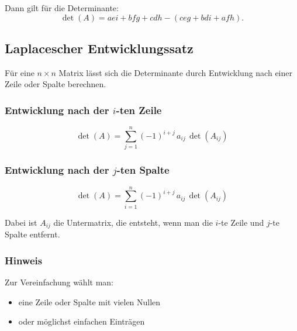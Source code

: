 \documentclass[9pt,a4paper]{article}
\begin{document}
    Dann gilt für die Determinante:
    \[
    \det(A)
    =
    aei + bfg + cdh
    -
    (ceg + bdi + afh).
    \]
    
    \subsection{Laplacescher Entwicklungssatz}
    Für eine $n\times n$ Matrix lässt sich die Determinante durch Entwicklung nach
    einer Zeile oder Spalte berechnen.
    
    \subsubsection*{Entwicklung nach der $i$-ten Zeile}
    \[
    \det(A)=\sum_{j=1}^{n} (-1)^{i+j}\,a_{ij}\,\det(A_{ij})
    \]
    
    \subsubsection*{Entwicklung nach der $j$-ten Spalte}
    \[
    \det(A)=\sum_{i=1}^{n} (-1)^{i+j}\,a_{ij}\,\det(A_{ij})
    \]
    
    Dabei ist $A_{ij}$ die Untermatrix, die entsteht, wenn man die
    $i$-te Zeile und $j$-te Spalte entfernt.
    
    \subsubsection*{Hinweis}
    Zur Vereinfachung wählt man:
    \begin{itemize}
        \item eine Zeile oder Spalte mit vielen Nullen
        \item oder möglichst einfachen Einträgen
    \end{itemize}
    
\end{document}
